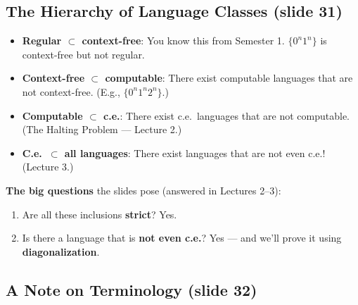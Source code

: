 \documentclass[11pt,a4paper]{article}
\begin{document}
\subsection{The Hierarchy of Language Classes (slide 31)}

\begin{center}
\end{center}

\begin{itemize}[nosep]
\item \textbf{Regular $\subset$ context-free}: You know this from Semester 1. $\{0^n 1^n\}$ is context-free but not regular.
\item \textbf{Context-free $\subset$ computable}: There exist computable languages that are not context-free. (E.g., $\{0^n 1^n 2^n\}$.)
\item \textbf{Computable $\subset$ c.e.}: There exist c.e.\ languages that are not computable. (The Halting Problem --- Lecture 2.)
\item \textbf{C.e.\ $\subset$ all languages}: There exist languages that are not even c.e.! (Lecture 3.)
\end{itemize}

\textbf{The big questions} the slides pose (answered in Lectures 2--3):
\begin{enumerate}[nosep]
\item Are all these inclusions \textbf{strict}? Yes.
\item Is there a language that is \textbf{not even c.e.}? Yes --- and we'll prove it using \textbf{diagonalization}.
\end{enumerate}


\subsection{A Note on Terminology (slide 32)}
\end{document}
